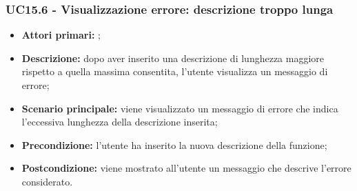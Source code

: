 \subsubsection{UC15.6 - Visualizzazione errore: descrizione troppo lunga}
\begin{itemize}
	\item \textbf{Attori primari:} \us{};
	\item \textbf{Descrizione:} dopo aver inserito una descrizione di lunghezza maggiore rispetto a quella massima consentita, l’utente visualizza un messaggio di errore; 
	\item \textbf{Scenario principale:} viene visualizzato un messaggio di errore che indica l’eccessiva lunghezza della descrizione inserita;
	\item \textbf{Precondizione:} l’utente ha inserito la nuova descrizione della funzione;
	\item \textbf{Postcondizione:} viene mostrato all’utente un messaggio che descrive l’errore considerato.
\end{itemize}
